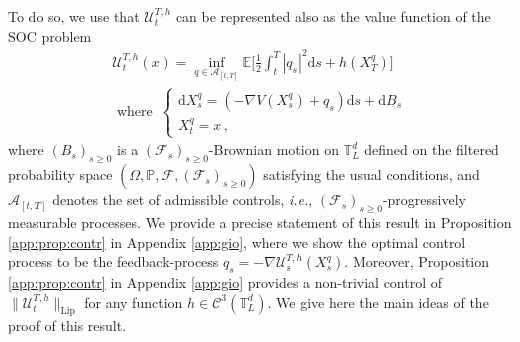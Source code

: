 \documentclass[final,12pt]{colt2023} %
\def\ie{\textit{i.e.}}
\newcommand{\bbE}{\mathbb{E}}
\newcommand{\De}{\mathrm{d}}
\def\torus{\tset}
\def\torusL{\torus_L}
\def\tset{\mathbb{T}}
\def\ie{\textit{i.e.}}
\def\PP{\mathbb{P}}
\def\mcf{\mathcal{F}}
\begin{document}
To do so, we use that $\mathcal{U}^{T,h}_t$ can be represented also as the value function of the SOC problem
\begin{equation}
  \label{eq:soc_main}
\begin{split}
  \mathcal{U}^{T,h}_t(x)= \inf_{q\in \mathcal{A}_{[t,T]}} \bbE\biggl[\frac{1}{2}\int_t^T|q_s|^2\De s +h(X^q_T)\biggr]\,
  \\
  \text{ where }\,
\begin{cases}\De X^q_s=(-\nabla V(X^q_s)+q_s)\De s + \De B_s\\
X^q_t=x\,,\end{cases}
\end{split}
\end{equation}
where $(B_s)_{s \geq 0}$ is a $(\mcf_s)_{s \geq 0}$-Brownian motion on $\torusL^d$  defined on the filtered probability space $(\Omega,\PP,\mcf,(\mcf_s)_{s \geq 0})$ satisfying the usual conditions, and $\mathcal{A}_{[t,T]}$ denotes the set of admissible controls, \ie, $(\mcf_s)_{s \geq 0}$-progressively measurable processes.  We provide a precise statement of this result in Proposition \ref{app:prop:contr} in Appendix \ref{app:gio}, 
where we show the optimal control process to be the feedback-process $q_s=-\nabla\mathcal{U}_s^{T,h}(X_s^q)$. Moreover, Proposition \ref{app:prop:contr} in Appendix \ref{app:gio} provides a non-trivial control of $\|\mathcal{U}^{T,h}_t\|_{\mathrm{Lip}}$ for any function $h\in \mathcal{C}^3(\mathbb{T}_L^d)$. We give here the main ideas of the proof of this result. 
\end{document}
